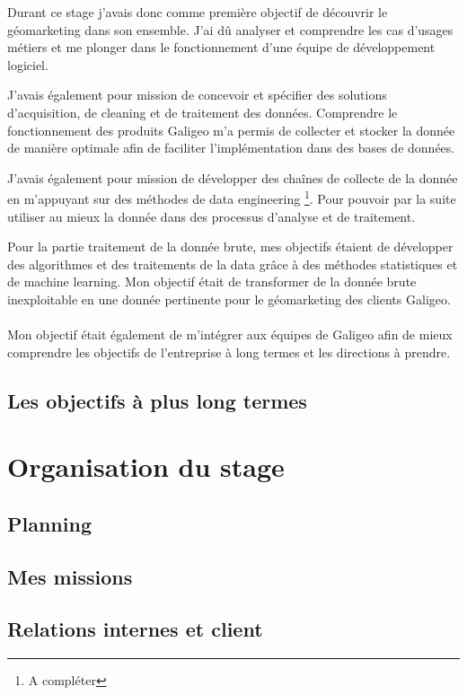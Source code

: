 Durant ce stage j’avais donc comme première objectif de découvrir le géomarketing dans son ensemble. J’ai dû analyser et comprendre les cas d’usages métiers et me plonger dans le fonctionnement d’une équipe de développement logiciel.

J’avais également pour mission de concevoir et spécifier des solutions d’acquisition, de cleaning et de traitement des données. Comprendre le fonctionnement des produits Galigeo m’a permis de collecter et stocker la donnée de manière optimale afin de faciliter l’implémentation dans des bases de données.

J’avais également pour mission de développer des chaînes de collecte de la donnée en m’appuyant sur des méthodes de data engineering \footnote{A compléter}. Pour pouvoir par la suite utiliser au mieux la donnée dans des processus d’analyse et de traitement.

Pour la partie traitement de la donnée brute, mes objectifs étaient de développer des algorithmes et des traitements de la data grâce à des méthodes statistiques et de machine learning. Mon objectif était de transformer de la donnée brute inexploitable en une donnée pertinente pour le géomarketing des clients Galigeo.

\paragraph*{}

Mon objectif était également de m’intégrer aux équipes de Galigeo afin de mieux comprendre les objectifs de l’entreprise à long termes et les directions à prendre.


\subsection{Les objectifs à plus long termes}

\section{Organisation du stage}

\subsection{Planning}
\subsection{Mes missions}
\subsection{Relations internes et client}